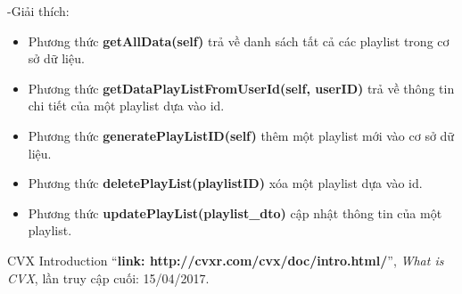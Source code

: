 \documentclass[a4paper]{article}
\begin{document}
\begin{flushleft}
	-Giải thích:
	\begin{itemize}
		\item Phương thức \textbf{getAllData(self)} trả về danh sách tất cả các playlist trong cơ sở dữ liệu.
		\item Phương thức \textbf{getDataPlayListFromUserId(self, userID)} trả về thông tin chi tiết của một playlist dựa vào id.
		\item Phương thức \textbf{generatePlayListID(self)} thêm một playlist mới vào cơ sở dữ liệu.
		\item Phương thức \textbf{deletePlayList(playlistID)} xóa một playlist dựa vào id.
		\item Phương thức \textbf{updatePlayList(playlist\_dto)} cập nhật thông tin của một playlist.
	\end{itemize}
\end{flushleft}



\clearpage
\newpage
\begin{thebibliography}{80}

	CVX Introduction
	``\textbf{link: http://cvxr.com/cvx/doc/intro.html/}'',
	\textit{What is CVX}, lần truy cập cuối: 15/04/2017.

\end{thebibliography}
\end{document}
